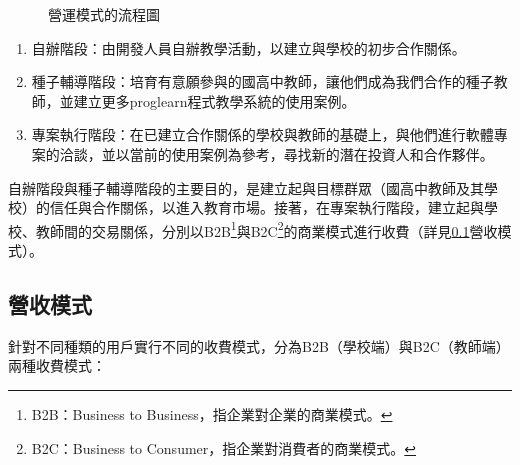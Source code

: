 \begin{figure}[h]
  \centering
  \caption{營運模式的流程圖}
\end{figure}


\begin{enumerate}
  \setlength{\parindent}{2em}
  \item 自辦階段：由開發人員自辦教學活動，以建立與學校的初步合作關係。
  \item 種子輔導階段：培育有意願參與的國高中教師，讓他們成為我們合作的種子教師，並建立更多proglearn程式教學系統的使用案例。
  \item 專案執行階段：在已建立合作關係的學校與教師的基礎上，與他們進行軟體專案的洽談，並以當前的使用案例為參考，尋找新的潛在投資人和合作夥伴。
\end{enumerate}

自辦階段與種子輔導階段的主要目的，是建立起與目標群眾（國高中教師及其學校）的信任與合作關係，以進入教育市場。接著，在專案執行階段，建立起與學校、教師間的交易關係，分別以B2B\footnote{B2B：Business to Business，指企業對企業的商業模式。}與B2C\footnote{B2C：Business to Consumer，指企業對消費者的商業模式。}的商業模式進行收費（詳見\ref{sec:revenue}營收模式）。

\subsection{營收模式} %
\label{sec:revenue}
針對不同種類的用戶實行不同的收費模式，分為B2B（學校端）與B2C（教師端）兩種收費模式：

